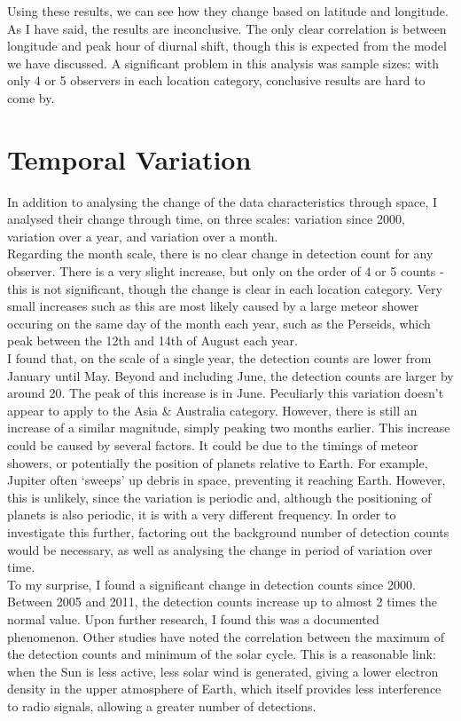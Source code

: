 \documentclass[12pt]{article}
\begin{document}
{{Using these results, we can see how they change based on latitude and longitude.
As I have said, the results are inconclusive. The only clear correlation is
between longitude and peak hour of diurnal shift, though this is expected from
the model we have discussed. A significant problem in this analysis was sample
sizes: with only 4 or 5 observers in each location category, conclusive results
are hard to come by.
}

\section{Temporal Variation}

\large{
In addition to analysing the change of the data characteristics through space, I
analysed their change through time, on three scales: variation since 2000,
variation over a year, and variation over a month.\\

Regarding the month scale, there is no clear change in detection count for any
observer. There is a very slight increase, but only on the order of 4 or 5
counts - this is not significant, though the change is clear in each location
category. Very small increases such as this are most likely caused by a large
meteor shower occuring on the same day of the month each year, such as the
Perseids, which peak between the 12th and 14th of August each year.\\

I found that, on the scale of a single year, the detection counts are lower from
January until May. Beyond and including June, the detection counts are larger by
around 20. The peak of this increase is in June. Peculiarly this variation
doesn't appear to apply to the Asia \& Australia category. However, there is
still an increase of a similar magnitude, simply peaking two months earlier.
This increase could be caused by several factors. It could be due to the timings
of meteor showers, or potentially the position of planets relative to Earth. For
example, Jupiter often `sweeps' up debris in space, preventing it reaching
Earth. However, this is unlikely, since the variation is periodic and, although
the positioning of planets is also periodic, it is with a very different
frequency. In order to investigate this further, factoring out the background
number of detection counts would be necessary, as well as analysing the change
in period of variation over time.\\

To my surprise, I found a significant change in detection counts since 2000.
Between 2005 and 2011, the detection counts increase up to almost 2 times the
normal value. Upon further research, I found this was a documented phenomenon.
Other studies have noted the correlation between the maximum of the detection
counts and minimum of the solar cycle. This is a reasonable link: when the Sun
is less active, less solar wind is generated, giving a lower electron density in
the upper atmosphere of Earth, which itself provides less interference to radio
signals, allowing a greater number of detections.\\

}}
\end{document}

